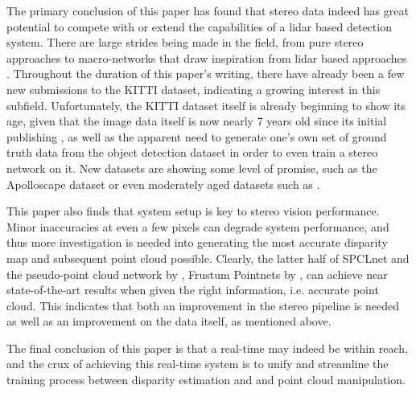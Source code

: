 The primary conclusion of this paper has found that stereo data indeed has great potential to compete with or extend the capabilities of a lidar based detection system. There are large strides being made in the field, from pure stereo approaches \cite{zeng2018rt3d,li_stereo_2019} to macro-networks that draw inspiration from lidar based approaches \cite{wang_pseudo-lidar_2019}. Throughout the duration of this paper's writing, there have already been a few new submissions to the KITTI dataset, indicating a growing interest in this subfield. Unfortunately, the KITTI dataset itself is already beginning to show its age, given that the image data itself is now nearly 7 years old since its initial publishing \cite{geiger_are_2012}, as well as the apparent need to generate one's own set of ground truth data from the object detection dataset in order to even train a stereo network on it. New datasets are showing some level of promise, such as the Apolloscape dataset \cite{huang_apolloscape_2018} or even moderately aged datasets such as \cite{cordts_cityscapes_2016}.

This paper also finds that system setup is key to stereo vision performance. Minor inaccuracies at even a few pixels can degrade system performance, and thus more investigation is needed into generating the most accurate disparity map and subsequent point cloud possible. Clearly, the latter half of SPCLnet and the pseudo-point cloud network by \cite{wang_pseudo-lidar_2019}, Frustum Pointnets by \cite{qi_frustum_2017}, can achieve near state-of-the-art results when given the right information, i.e. accurate point cloud. This indicates that both an improvement in the stereo pipeline is needed as well as an improvement on the data itself, as mentioned above.

The final conclusion of this paper is that a real-time may indeed be within reach, and the crux of achieving this real-time system is to unify and streamline the training process between disparity estimation and and point cloud manipulation. 






